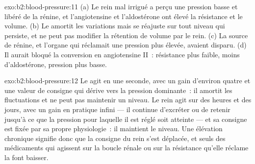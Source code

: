 \begin{solution}{exo:b2:blood-pressure:11}
(a) Le rein mal irrigué a perçu une pression basse et libéré de la
rénine, et l'angiotensine et l'aldostérone ont élevé la résistance et le
volume. (b) Le  amortit les variations mais se réajuste sur
tout niveau qui persiste, et ne peut pas modifier la rétention de volume
par le rein. (c) La source de rénine, et l'organe qui réclamait une
pression plus élevée, avaient disparu. (d) Il aurait bloqué la
conversion en angiotensine II~: résistance plus faible, moins
d'aldostérone, pression plus basse.
\end{solution}

\begin{solution}{exo:b2:blood-pressure:12}
Le  agit en une seconde, avec un gain d'environ quatre et une
valeur de consigne qui dérive vers la pression dominante~: il amortit les
fluctuations et ne peut pas maintenir un niveau. Le rein agit sur des
heures et des jours, avec un gain en pratique infini --- il continue
d'excréter ou de retenir jusqu'à ce que la pression pour laquelle il est
réglé soit atteinte --- et sa consigne est fixée par sa propre
physiologie~: il maintient le niveau. Une élévation chronique signifie
donc que la consigne du rein s'est déplacée, et seuls des médicaments qui
agissent sur la boucle rénale ou sur la résistance qu'elle réclame la
font baisser.
\end{solution}


